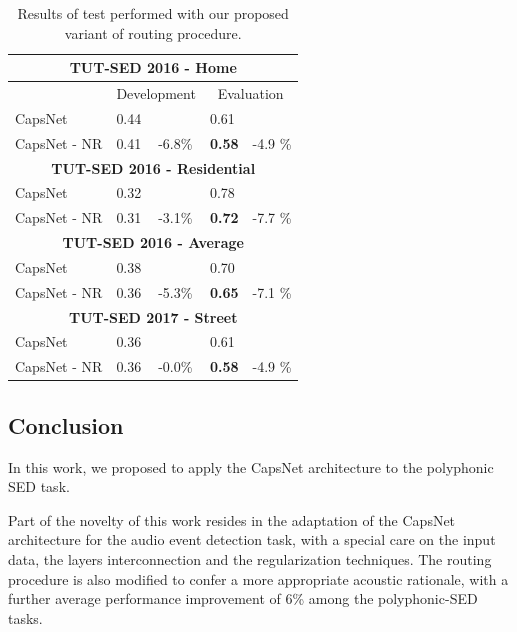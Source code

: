 \begin{table}[ht]
	\centering 
	\begin{tabular}{@{}lllll@{}}
		\toprule
		\multicolumn{5}{c}{\textbf{TUT-SED 2016 - Home}}                                   \\ \midrule
		& \multicolumn{2}{c|}{Development}   & \multicolumn{2}{c}{Evaluation} \\ \midrule
		CapsNet      & 0.44 & \multicolumn{1}{l|}{}       & 0.61              &            \\
		CapsNet - NR & 0.41 & \multicolumn{1}{l|}{-6.8\%} & \textbf{0.58}     & -4.9 \%    \\ \midrule
		\multicolumn{5}{c}{\textbf{TUT-SED 2016 - Residential}}                            \\ \midrule
		CapsNet      & 0.32 & \multicolumn{1}{l|}{}       & 0.78              &            \\
		CapsNet - NR & 0.31 & \multicolumn{1}{l|}{-3.1\%} & \textbf{0.72}     & -7.7 \%    \\ \midrule
		\multicolumn{5}{c}{\textbf{TUT-SED 2016 - Average}}                                \\ \midrule
		CapsNet      & 0.38 & \multicolumn{1}{l|}{}       & 0.70              &            \\
		CapsNet - NR & 0.36 & \multicolumn{1}{l|}{-5.3\%} & \textbf{0.65}     & -7.1 \%    \\ \midrule
		\multicolumn{5}{c}{\textbf{TUT-SED 2017 - Street}}                                 \\ \midrule
		CapsNet      & 0.36 & \multicolumn{1}{l|}{}       & 0.61              &            \\
		CapsNet - NR & 0.36 & \multicolumn{1}{l|}{-0.0\%} & \textbf{0.58}     & -4.9 \%    \\ \bottomrule
	\end{tabular}
	\caption[Polyphonic SED with CapsNets - Alternative routing]{Results of test performed with our proposed variant of routing procedure.}		
	\label{tbl:results-new-routing}
\end{table}

\subsection{Conclusion}
\label{sec:conclusions}
In this work, we proposed to apply the CapsNet architecture to the polyphonic SED task. 

Part of the novelty of this work resides in the adaptation of the CapsNet architecture for the audio event detection task, with a special care on the input data, the layers interconnection and the regularization techniques. The routing procedure is also modified to confer a more appropriate acoustic rationale, with a further average performance improvement of 6\% among the polyphonic-SED tasks.

